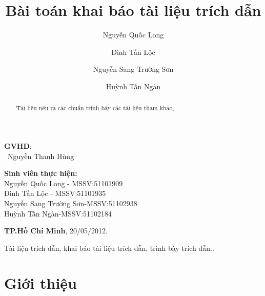 \documentclass{hcmutarticle}
\begin{document}
\begin{minipage}[t]{0.60\linewidth}
\textbf{GVHD}: \\
\ Nguyễn Thanh Hùng
\end{minipage}
\begin{minipage}[t]{0.40\linewidth}
\textbf{Sinh viên thực hiện:}\\
Nguyễn Quốc Long - MSSV:51101909\\
Đinh Tấn Lộc - MSSV:51101935
\\Nguyễn Sang Trường Sơn-MSSV:51102938
\\Huỳnh Tấn Ngàn-MSSV:51102184
\end{minipage}

\vspace{3cm}

\begin{center}

\textbf{TP.Hồ Chí Minh},
20/05/2012.

\end{center}



\newpage

\tableofcontents 

\newpage

\title{Bài toán khai báo tài liệu trích dẫn}

\author{  Nguyễn Quốc Long 
\and Đinh Tấn Lộc
\and Nguyễn Sang Trường Sơn 
\and Huỳnh Tấn Ngàn }



\maketitle



\begin{abstract}
Tài liệu nêu ra các chuẩn trình bày các tài liệu tham khảo, 


\end{abstract}

\begin{keywords}
Tài liệu trích dẫn, khai báo tài liệu trích dẫn, trình bày trích dẫn..
\end{keywords} 


\section{Giới thiệu}
\end{document}
